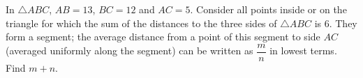 In $\triangle ABC$, $AB=13$, $BC=12$ and $AC=5$. Consider all points inside or on the triangle for which the sum of the distances to the three sides of $\triangle ABC$ is $6$. They form a segment; the average distance from a point of this segment to side $AC$ (averaged uniformly along the segment) can be written as $\dfrac {m}{n}$ in lowest terms. Find $m+n$.
